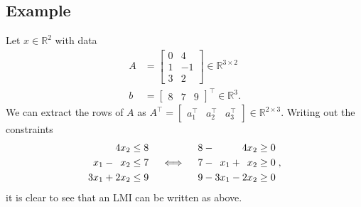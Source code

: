 \documentclass[a4paper]{article}
\begin{document}
\subsection*{Example}
Let $x\in\mathbb{R}^2$ with data
\begin{align*}
A &= \begin{bmatrix}0&4\\1&-1\\3&2\end{bmatrix}\in\mathbb{R}^{3\times 2} \\
b &= \begin{bmatrix}8&7&9\end{bmatrix}^\top\in\mathbb{R}^3.
\end{align*}
We can extract the rows of $A$ as $A^\top = \begin{bmatrix}a_1^\top & a_2^\top & a_3^\top\end{bmatrix}\in\mathbb{R}^{2\times 3}$.
Writing out the constraints
\begin{equation*}
\begin{split}
\hphantom{0x_1{}+{}} 4x_2 &\le 8 \\
\hphantom{0}x_1 - \hphantom{0}x_2 &\le 7 \\
3x_1 + 2x_2 &\le 9
\end{split}
\quad\iff\quad
\begin{split}
8 - \hphantom{0x_1{}+{}} 4x_2 &\ge 0 \\
7 - \hphantom{0}x_1 + \hphantom{0}x_2 &\ge 0 \\
9 - 3x_1 - 2x_2 &\ge 0
\end{split}\;,
\end{equation*}
it is clear to see that an LMI can be written as above.
\end{document}
